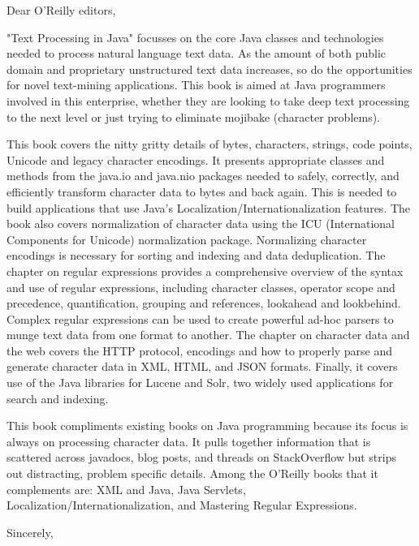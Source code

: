 
\begin{letter}
\opening{Dear O'Reilly editors,}

"Text Processing in Java" focusses on the core Java classes and
technologies needed to process natural language text data.
As the amount of both public domain and proprietary unstructured text data
increases, so do the opportunities for novel text-mining applications.
This book is aimed at Java programmers involved in this enterprise,
whether they are looking to take deep text processing to the next
level or just trying to eliminate mojibake (character problems).

This book covers the nitty gritty details of bytes, characters, strings, 
code points, Unicode and legacy character encodings.
It presents appropriate classes and methods from the java.io and java.nio packages
needed to safely, correctly, and efficiently transform character data
to bytes and back again.
This is needed to build applications that
use Java's Localization/Internationalization features.
The book also covers normalization of character data using the ICU 
(International Components for Unicode) normalization package.
Normalizing character encodings is necessary for
sorting and indexing and data deduplication.
The chapter on regular expressions provides a comprehensive overview
of the  syntax and use of regular expressions,
including character classes, operator scope and precedence, quantification,
grouping and references,  lookahead and lookbehind.
Complex regular expressions can be used to create powerful
ad-hoc parsers to munge text data from one format to another.
The chapter on character data and the web covers the HTTP protocol,
encodings and how to properly parse and generate character data in 
XML, HTML, and JSON formats.
Finally, it covers use of the Java libraries for Lucene and Solr,
two widely used applications for search and indexing.

This book compliments existing books on Java programming because
its focus is always on processing character data.  It pulls together
information that is scattered across javadocs, blog posts, and threads on
StackOverflow but strips out distracting, problem specific details.
Among the O'Reilly books that it complements are:
XML and Java,
Java Servlets,
Localization/Internationalization,
and Mastering Regular Expressions.

\closing{Sincerely,}
\end{letter}

